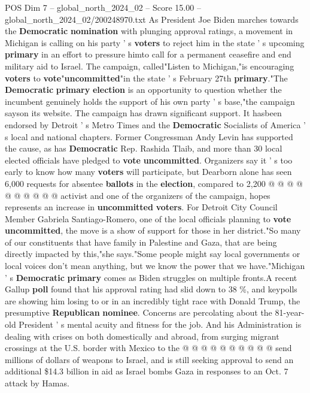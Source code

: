 \begin{textsample}{POS Dim 7 – global\_north\_2024\_02 – Score 15.00 – global\_north\_2024\_02/200248970.txt}  \label{ex:f7_pos_023}
As President Joe Biden marches towards the \textbf{Democratic} \textbf{nomination} with plunging approval ratings, a movement in Michigan is calling on his party ' s \textbf{voters} to reject him in the state ' s upcoming \textbf{primary} in an effort to pressure himto call for a permanent ceasefire and end military aid to Israel.
The campaign, called"Listen to Michigan,"is encouraging \textbf{voters} to \textbf{vote}"\textbf{uncommitted}"in the state ' s February 27th \textbf{primary}."The \textbf{Democratic} \textbf{primary} \textbf{election} is an opportunity to question whether the incumbent genuinely holds the support of his own party ' s base,"the campaign sayson its website.
The campaign has drawn significant support.
It hasbeen endorsed by Detroit ' s Metro Times and the \textbf{Democratic} Socialists of America ' s local and national chapters.
Former Congressman Andy Levin has supported the cause, as has \textbf{Democratic} Rep.
Rashida Tlaib, and more than 30 local elected officials have pledged to \textbf{vote} \textbf{uncommitted}.
Organizers say it ' s too early to know how many \textbf{voters} will participate, but Dearborn alone has seen 6,000 requests for absentee \textbf{ballots} in the \textbf{election}, compared to 2,200 @ @ @ @ @ @ @ @ @ @ activist and one of the organizers of the campaign, hopes represents an increase in \textbf{uncommitted} \textbf{voters}.
For Detroit City Council Member Gabriela Santiago-Romero, one of the local officials planning to \textbf{vote} \textbf{uncommitted}, the move is a show of support for those in her district."So many of our constituents that have family in Palestine and Gaza, that are being directly impacted by this,"she says."Some people might say local governments or local voices don't mean anything, but we know the power that we have."Michigan ' s \textbf{Democratic} \textbf{primary} comes as Biden struggles on multiple fronts.A recent Gallup \textbf{poll} found that his approval rating had slid down to 38 \%, and keypolls are showing him losing to or in an incredibly tight race with Donald Trump, the presumptive \textbf{Republican} \textbf{nominee}.
Concerns are percolating about the 81-year-old President ' s mental acuity and fitness for the job.
And his Administration is dealing with crises on both domestically and abroad, from surging migrant crossings at the U.S. border with Mexico to the @ @ @ @ @ @ @ @ @ @ send millions of dollars of weapons to Israel, and is still seeking approval to send an additional \$14.3 billion in aid as Israel bombs Gaza in responses to an Oct. 7 attack by Hamas.

\end{textsample}
